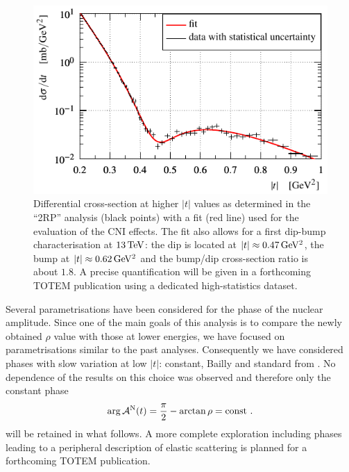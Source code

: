 \begin{figure}
\vskip-5mm
\begin{center}
\includegraphics{fig/high_t_description.pdf}
\caption{%
Differential cross-section at higher $|t|$ values as determined in the ``2RP'' analysis (black points) with a fit (red line) used for the evaluation of the CNI effects. The fit also allows for a first dip-bump characterisation at $13\,{\rm TeV}$: the dip is located at $|t| \approx 0.47\,{\rm GeV^2}$, the bump at $|t|\approx 0.62\,{\rm GeV^2}$ and the bump/dip cross-section ratio is about $1.8$. A precise quantification will be given in a forthcoming TOTEM publication using a dedicated high-statistics dataset.
}
\label{fig:high t desc}
\end{center}
\end{figure}

Several parametrisations have been considered for the phase of the nuclear amplitude. Since one of the main goals of this analysis is to compare the newly obtained $\rho$ value with those at lower energies, we have focused on parametrisations similar to the past analyses. Consequently we have considered phases with slow variation at low $|t|$: constant, Bailly and standard from \cite{totem-8tev-1km}. No dependence of the results on this choice was observed and therefore only the constant phase
\begin{equation}
\label{eq:nuc phase con}
\arg {\cal A}^{\rm N}(t) = {\pi\over 2} - \arctan\rho = \hbox{const} \ .
\end{equation}
will be retained in what follows. A more complete exploration including phases leading to a peripheral description of elastic scattering is planned for a forthcoming TOTEM publication.

